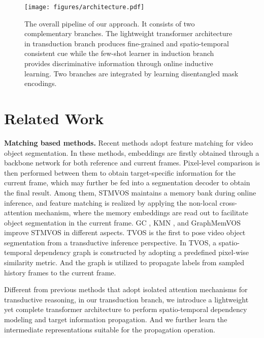 \documentclass[10pt,twocolumn,letterpaper]{article}
\begin{document}
\begin{figure*}
	\begin{center}
\texttt{[image: figures/architecture.pdf]}
	\vspace{-2.0em}
	\end{center}
	\caption{The overall pipeline of our approach. It consists of two complementary branches. The lightweight transformer architecture in transduction branch produces fine-grained and spatio-temporal consistent cue while the few-shot learner in induction branch provides discriminative information through online inductive learning. Two branches are integrated by learning disentangled mask encodings.}
	\label{fig:architecture}
	\vspace{-1.0em}
\end{figure*}

\section{Related Work}
\noindent\textbf{Matching based methods.}
Recent methods  \cite{li2020A,lu2020A,Seoung2019A,Seong2020A,PLM2017A,feelvos2019A,ranet2019A,CFBI2020A,Zhang2020A} adopt feature matching for video object segmentation. In these methods, embeddings are firstly obtained through a backbone network for both reference and current frames. Pixel-level comparison is then performed between them to obtain target-specific information for the current frame, which may further be fed into a segmentation decoder to obtain the final result. Among them, STMVOS \cite{Seoung2019A} maintains a memory bank during online inference, and feature matching is realized by applying the non-local cross-attention mechanism, where the memory embeddings are read out to facilitate object segmentation in the current frame. GC \cite{li2020A}, KMN \cite{Seong2020A}, and GraphMemVOS \cite{lu2020A} improve STMVOS in different aspects. TVOS \cite{Zhang2020A} is the first to pose video object segmentation from a transductive inference perspective. In TVOS, a spatio-temporal dependency graph is constructed by adopting a predefined pixel-wise similarity metric. And the graph is utilized to propagate labels from sampled history frames to the current frame.

Different from previous methods \cite{Seoung2019A,Zhang2020A} that adopt isolated attention mechanisms for transductive reasoning, in our transduction branch, we introduce a lightweight yet complete transformer architecture to perform spatio-temporal dependency modeling and target information propagation. And we further learn the intermediate representations suitable for the propagation operation.
\end{document}
